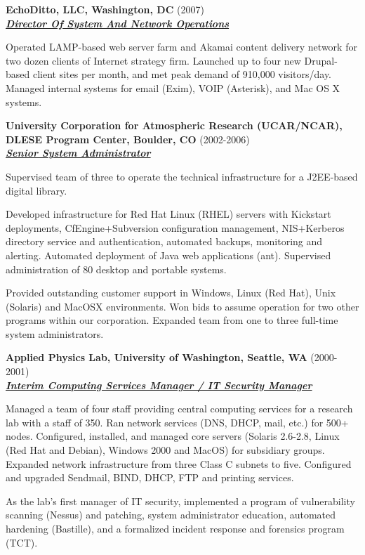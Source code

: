 \documentclass{article}
\newcommand{\employer}[3]{{ \textbf{#1} (#2)\\ \underline{\textbf{\emph{#3}}}\\ \nopagebreak }}
\newenvironment{achievements}{\begin{list}{\topsep 0pt \itemsep -2pt}} {\vspace*{4pt}\end{list}}
\begin{document}
\employer{EchoDitto, LLC, Washington, DC}{2007}{Director Of System And Network Operations}
\begin{achievements}
  \item Operated LAMP-based web server farm and Akamai content delivery network for two dozen clients of Internet strategy firm.  Launched up to four new Drupal-based client sites per month, and met peak demand of 910,000 visitors/day.  Managed internal systems for email (Exim), VOIP (Asterisk), and Mac OS X systems. 
\end{achievements}
 
\employer{University Corporation for Atmospheric Research (UCAR/NCAR), DLESE
Program Center, Boulder, CO}{2002-2006}{Senior System Administrator}
\begin{achievements}
    \item Supervised team of three to operate the technical infrastructure for a J2EE-based digital library.  
    \item Developed infrastructure for Red Hat Linux (RHEL) servers with Kickstart deployments, CfEngine+Subversion configuration management, NIS+Kerberos directory service and authentication, automated backups, monitoring and alerting.  Automated deployment of Java web applications (ant). Supervised administration of 80 desktop and portable systems.  
    \item Provided outstanding customer support in Windows, Linux (Red Hat), Unix (Solaris) and MacOSX environments.  Won bids to assume operation for two other programs within our corporation.  Expanded team from one to three full-time system administrators. 
\end{achievements}


\employer{Applied Physics Lab, University of Washington, Seattle, WA
}{2000-2001}{Interim Computing Services Manager / IT Security Manager}
\begin{achievements}
    \item Managed a team of four staff providing central computing services for a research lab with a staff of 350. Ran network services (DNS, DHCP, mail, etc.) for 500+ nodes. Configured, installed, and managed core servers (Solaris 2.6-2.8, Linux (Red Hat and Debian), Windows 2000 and MacOS) for subsidiary groups.  Expanded network infrastructure from three Class C subnets to five.  Configured and upgraded Sendmail, BIND, DHCP, FTP and printing services.
    \item As the lab's first manager of IT security, implemented a program of vulnerability scanning (Nessus) and patching, system administrator education, automated hardening (Bastille), and a formalized incident response and forensics program (TCT).
\end{achievements}
\end{document}

